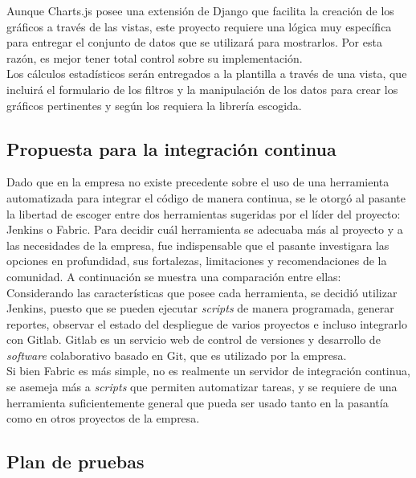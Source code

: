 Aunque Charts.js posee una extensión de Django que facilita la creación de los gráficos a través de las vistas, este proyecto requiere una lógica muy específica para entregar el conjunto de datos que se utilizará para mostrarlos. Por esta razón, es mejor tener total control sobre su implementación. \\

Los cálculos estadísticos serán entregados a la plantilla a través de una vista, que incluirá el formulario de los filtros y la manipulación de los datos para crear los gráficos pertinentes y según los requiera la librería escogida.

\subsection{Propuesta para la integración continua}

Dado que en la empresa no existe precedente sobre el uso de una herramienta automatizada para integrar el código de manera continua, se le otorgó al pasante la libertad de escoger entre dos herramientas sugeridas por el líder del proyecto: Jenkins o Fabric. Para decidir cuál herramienta se adecuaba más al proyecto y a las necesidades de la empresa, fue indispensable que el pasante investigara las opciones en profundidad, sus fortalezas, limitaciones y recomendaciones de la comunidad. A continuación se muestra una comparación entre ellas: \\



Considerando las características que posee cada herramienta, se decidió
utilizar Jenkins, puesto que se pueden ejecutar \textit{scripts} de manera
programada, generar reportes, observar el estado del despliegue de varios
proyectos e incluso integrarlo con Gitlab. Gitlab es un servicio web de control de versiones y desarrollo de \textit{software} colaborativo basado en Git, que es utilizado por la empresa.\\

Si bien Fabric es más simple, no es realmente un servidor de integración continua, se asemeja más a \textit{scripts} que permiten automatizar tareas, y se requiere de una herramienta suficientemente general que pueda ser usado tanto en la pasantía como en otros proyectos de la empresa.

\subsection{Plan de pruebas}

